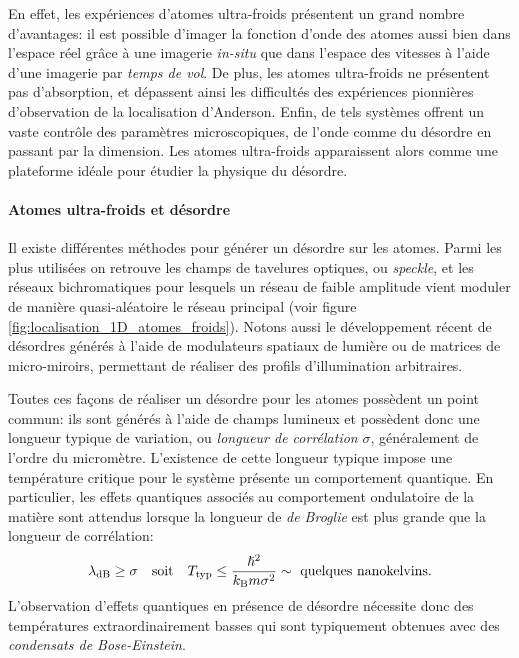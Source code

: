 En effet, les expériences d'atomes ultra-froids présentent un grand nombre d'avantages: il est possible d'imager la fonction d'onde des atomes aussi bien dans l'espace réel grâce à une imagerie \emph{in-situ} que dans l'espace des vitesses à l'aide d'une imagerie par \emph{temps de vol}. De plus, les atomes ultra-froids ne présentent pas d'absorption, et dépassent ainsi les difficultés des expériences pionnières d'observation de la localisation d'Anderson. Enfin, de tels systèmes offrent un vaste contrôle des paramètres microscopiques, de l'onde comme du désordre en passant par la dimension. Les atomes ultra-froids apparaissent alors comme une plateforme idéale pour étudier la physique du désordre.


\paragraph*{Atomes ultra-froids et désordre}
Il existe différentes méthodes pour générer un désordre sur les atomes. Parmi les plus utilisées on retrouve les champs de tavelures optiques, ou \emph{speckle}, et les réseaux bichromatiques pour lesquels un réseau de faible amplitude vient moduler de manière quasi-aléatoire le réseau principal (voir figure \ref{fig:localisation_1D_atomes_froids}). Notons aussi le développement récent de désordres générés à l'aide de modulateurs spatiaux de lumière ou de matrices de micro-miroirs, permettant de réaliser des profils d'illumination arbitraires.

Toutes ces façons de réaliser un désordre pour les atomes possèdent un point commun: ils sont générés à l'aide de champs lumineux et possèdent donc une longueur typique de variation, ou \emph{longueur de corrélation} $\sigma$, généralement de l'ordre du micromètre. L'existence de cette longueur typique impose une température critique pour le système présente un comportement quantique. En particulier, les effets quantiques associés au comportement ondulatoire de la matière sont attendus lorsque la longueur de \emph{de Broglie} est plus grande que la longueur de corrélation:
\begin{equation}
\lambda_{\mathrm{dB}}\geq\sigma \quad \text{soit} \quad T_{\mathrm{typ}} \leq \frac{\hslash^2}{ k_{\mathrm{B}} m \sigma^2}\sim \text{ quelques nanokelvins.}
\end{equation}
L'observation d'effets quantiques en présence de désordre nécessite donc des températures extraordinairement basses qui sont typiquement obtenues avec des \emph{condensats de Bose-Einstein}. 

